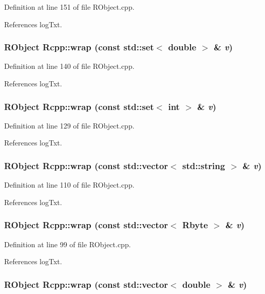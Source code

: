 Definition at line 151 of file RObject.cpp.

References logTxt.\hypertarget{namespaceRcpp_ad3b81d79ed0de1834ea38f995ad39f31}{
\subsubsection[{wrap}]{\setlength{\rightskip}{0pt plus 5cm}RObject Rcpp::wrap (const std::set$<$ double $>$ \& {\em v})}}
\label{namespaceRcpp_ad3b81d79ed0de1834ea38f995ad39f31}


Definition at line 140 of file RObject.cpp.

References logTxt.\hypertarget{namespaceRcpp_af1fb1519713bb98d753ce69fe55b9b7d}{
\subsubsection[{wrap}]{\setlength{\rightskip}{0pt plus 5cm}RObject Rcpp::wrap (const std::set$<$ int $>$ \& {\em v})}}
\label{namespaceRcpp_af1fb1519713bb98d753ce69fe55b9b7d}


Definition at line 129 of file RObject.cpp.

References logTxt.\hypertarget{namespaceRcpp_a054f4cfb15317bdce6b30efa30f0e2ea}{
\subsubsection[{wrap}]{\setlength{\rightskip}{0pt plus 5cm}RObject Rcpp::wrap (const std::vector$<$ std::string $>$ \& {\em v})}}
\label{namespaceRcpp_a054f4cfb15317bdce6b30efa30f0e2ea}


Definition at line 110 of file RObject.cpp.

References logTxt.\hypertarget{namespaceRcpp_a8dfe3bacd7033e5edcc9341a8de47132}{
\subsubsection[{wrap}]{\setlength{\rightskip}{0pt plus 5cm}RObject Rcpp::wrap (const std::vector$<$ Rbyte $>$ \& {\em v})}}
\label{namespaceRcpp_a8dfe3bacd7033e5edcc9341a8de47132}


Definition at line 99 of file RObject.cpp.

References logTxt.\hypertarget{namespaceRcpp_add0776494532ff31ee34f89ead80b15f}{
\subsubsection[{wrap}]{\setlength{\rightskip}{0pt plus 5cm}RObject Rcpp::wrap (const std::vector$<$ double $>$ \& {\em v})}}
\label{namespaceRcpp_add0776494532ff31ee34f89ead80b15f}


